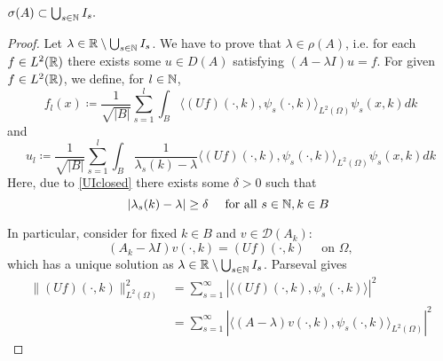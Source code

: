 {\color{gray} %
\begin{theorem} \label{4.1:thm-MainResult.SecondInclusion}

	$\sigma(A) \subset \bigcup_{s \in \mathbb{N}} I_{s}.$

	\begin{proof}
		Let $\lambda \in \mathbb{R} \setminus \bigcup_{s \in \mathbb{N}} I_{s}$. We have to prove that $\lambda \in \rho(A)$, i.e. for each $f \in L^{2}(\mathbb{R})$ there exists some $u \in D(A)$ satisfying $(A-\lambda I)u = f$. For given $f \in L^{2}(\mathbb{R})$, we define, for $l \in \mathbb{N}$, 
			\[ f_{l}(x) \coloneqq \frac{1}{\sqrt{|B|}} \sum_{s=1}^{l} \int_{B} \langle (Uf)(\cdot, k), \psi_{s}(\cdot, k)\rangle_{L^{2}(\Omega)} \psi_{s}(x,k) dk \]
			and
			\begin{equation}
				u_{l} \coloneqq \frac{1}{\sqrt{|B|}} \sum_{s=1}^{l} \int_{B} \frac{1}{\lambda_{s}(k) - \lambda} \langle (Uf)(\cdot, k), \psi_{s}(\cdot, k)\rangle_{L^{2}(\Omega)} \psi_{s}(x, k) dk \label{ul}
			\end{equation} 
		Here, due to \eqref{UIclosed} there exists some $\delta > 0$ such that
			\begin{equation}
				|\lambda_{s}(k) - \lambda| \geq \delta \quad \text{ for all } s \in \N, k \in B \label{lambda-distance}
			\end{equation}

		In particular, consider for fixed $k \in B$ and $v \in \mathcal{D}(A_{k})$:
		\begin{equation}
			(A_{k} - \lambda I) v(\cdot, k) = (Uf)(\cdot, k) \quad \text{ on } \Omega, \label{4.9}			
		\end{equation}
		which has a unique solution as $\lambda \in \mathbb{R} \setminus \bigcup_{s \in \mathbb{N}} I_{s}$. Parseval gives
		\begin{align*}
			\| (Uf)(\cdot, k)\|^{2}_{L^{2}(\Omega)} & = \sum_{s=1}^{\infty} |\langle (Uf)(\cdot, k), \psi_{s}(\cdot, k)\rangle|^{2} \\
			& = \sum_{s=1}^{\infty}|\langle (A - \lambda) v(\cdot, k), \psi_{s}(\cdot, k)\rangle_{L^{2}(\Omega)}|^{2}
		\end{align*}


\end{proof}
\end{theorem}}
